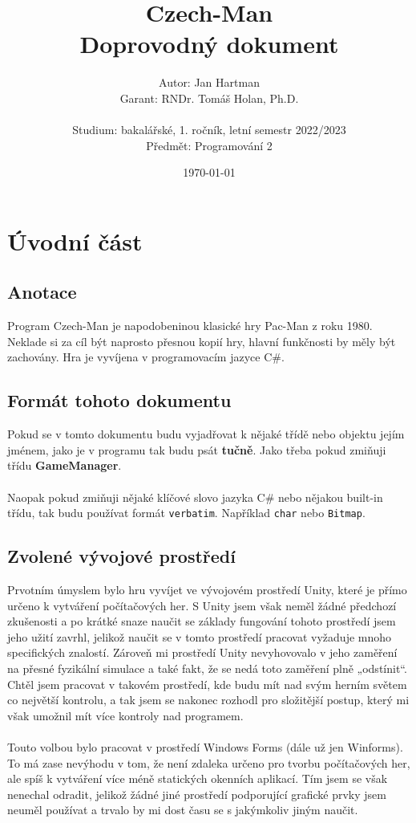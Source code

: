 \documentclass[a4]{article}
\title{Czech-Man
\\Doprovodný dokument}
\author{Autor: Jan Hartman
\\Garant: RNDr. Tomáš Holan, Ph.D.
\\\\Studium: bakalářské, 1. ročník, letní semestr 2022/2023
\\Předmět: Programování 2}
\date{\today}
\begin{document}
\maketitle
\tableofcontents
\pagestyle{fancy}
\newpage
\section{Úvodní část}
\subsection{Anotace}
Program Czech-Man je napodobeninou klasické hry Pac-Man z roku 1980. Neklade si za cíl být naprosto přesnou kopií hry, hlavní funkčnosti by měly být zachovány. Hra je vyvíjena v programovacím jazyce C\#.
\subsection{Formát tohoto dokumentu}
Pokud se v tomto dokumentu budu vyjadřovat k nějaké třídě nebo objektu jejím jménem, jako je v programu tak budu psát \textbf{tučně}. Jako třeba pokud zmiňuji třídu \textbf{GameManager}.
\\\\
Naopak pokud zmiňuji nějaké klíčové slovo jazyka C\# nebo nějakou built-in třídu, tak budu používat formát \verb|verbatim|. Například \verb|char| nebo \verb|Bitmap|.
\subsection{Zvolené vývojové prostředí}
Prvotním úmyslem bylo hru vyvíjet ve vývojovém prostředí Unity, které je přímo určeno k vytváření počítačových her. S Unity jsem však neměl žádné předchozí zkušenosti a po krátké snaze naučit se základy fungování tohoto prostředí jsem jeho užití zavrhl, jelikož naučit se v tomto prostředí pracovat vyžaduje mnoho specifických znalostí. Zároveň mi prostředí Unity nevyhovovalo v jeho zaměření na přesné fyzikální simulace a také fakt, že se nedá toto zaměření plně „odstínit“. Chtěl jsem pracovat v takovém prostředí, kde budu mít nad svým herním světem co největší kontrolu, a tak jsem se nakonec rozhodl pro složitější postup, který mi však umožnil mít více kontroly nad programem.
\\\\
Touto volbou bylo pracovat v prostředí Windows Forms (dále už jen Winforms). To má zase nevýhodu v tom, že není zdaleka určeno pro tvorbu počítačových her, ale spíš k vytváření více méně statických okenních aplikací. Tím jsem se však nenechal odradit, jelikož žádné jiné prostředí podporující grafické prvky jsem neuměl používat a trvalo by mi dost času se s jakýmkoliv jiným naučit.
\newpage
\end{document}
